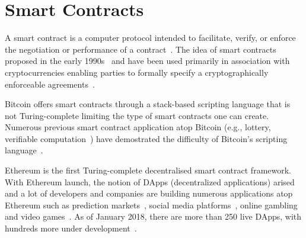 \chapter{Smart Contracts}
\label{smart_contracts}

A smart contract is a computer protocol intended to facilitate, verify, or enforce the negotiation or performance of a contract~\cite{FM548,wiki:smart_contract}.
The idea of smart contracts proposed in the early 1990s~\cite{FM548} and have been used primarily in association with cryptocurrencies enabling
parties to formally specify a cryptographically enforceable agreements~\cite{7163021}.

Bitcoin offers smart contracts through a stack-based scripting language that is not Turing-complete limiting the type of smart contracts one can create.
Numerous previous smart contract application atop Bitcoin (e.g., lottery\cite{Andrychowicz:2014:SMC:2650286.2650764,10.1007/978-3-662-44381-1_24},
verifiable computation~\cite{Kumaresan:2014:UBI:2660267.2660380}) have demostrated the difficulty of Bitcoin's scripting language~\cite{cryptoeprint:2015:675}.

Ethereum is the first Turing-complete decentralised smart contract framework. With Ethereum launch, the notion of DApps (decentralized applications) arised
and a lot of developers and companies are building numerous applications atop Ethereum such as prediction markets~\cite{augur,gnosis}, social media platforms~\cite{akasha,backfeed},
online gambling~\cite{etheroll,coinpoker} and video games~\cite{cryptokitties}. As of January 2018, there are more than 250 live DApps,
with hundreds more under development~\cite{wiki:ethereum}.
